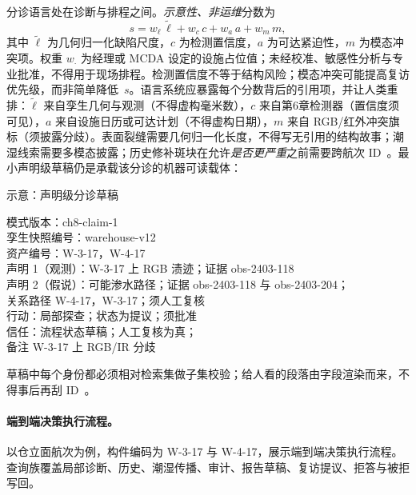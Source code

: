 分诊语言处在诊断与排程之间。\emph{示意性、非运维}分数为
\begin{equation}
\label{eq:ch8-score}
s = w_{\ell}\,\tilde{\ell} + w_{c}\,c + w_{a}\,a + w_{m}\,m,
\end{equation}
其中 $\tilde{\ell}$ 为几何归一化缺陷尺度，$c$ 为检测置信度，$a$ 为可达紧迫性，$m$ 为模态冲突项。权重 $w_{\cdot}$ 为经理或 MCDA 设定的设施占位值；未经校准、敏感性分析与专业批准，不得用于现场排程。检测置信度不等于结构风险；模态冲突可能提高复访优先级，而非简单降低~$s$。语言系统应暴露每个分数背后的引用项，并让人类重排：$\tilde{\ell}$ 来自孪生几何与观测（不得虚构毫米数），$c$ 来自第6章检测器（置信度须可见），$a$ 来自设施日历或可达计划（不得虚构日期），$m$ 来自 RGB/红外冲突旗标（须披露分歧）。表面裂缝需要几何归一化长度，不得写无引用的结构故事；潮湿线索需要多模态披露；历史修补斑块在允许\emph{是否更严重}之前需要跨航次 ID~\cite{zhao2024facade,zhao2026physical,jeon2025hybridrag}。最小声明级草稿仍是承载该分诊的机器可读载体：

\begin{programcode}{示意：声明级分诊草稿}
\begin{plainlisting}
模式版本：ch8-claim-1\\
孪生快照编号：warehouse-v12\\
资产编号：W-3-17，W-4-17\\
声明 1（观测）：W-3-17 上 RGB 渍迹；证据 obs-2403-118\\
声明 2（假说）：可能渗水路径；证据 obs-2403-118 与 obs-2403-204；\\
关系路径 W-4-17，W-3-17；须人工复核\\
行动：局部探查；状态为提议；须批准\\
信任：流程状态草稿；人工复核为真；\\
备注 W-3-17 上 RGB/IR 分歧
\end{plainlisting}
\end{programcode}

草稿中每个身份都必须相对检索集做子集校验；给人看的段落由字段渲染而来，不得事后再刮 ID~\cite{zheng2023bimassistant,joffe2025buildingcodes}。

\paragraph{端到端决策执行流程。}
\label{par:ch8-e2e}
以仓立面航次为例，构件编码为 W-3-17 与 W-4-17，展示端到端决策执行流程。查询族覆盖局部诊断、历史、潮湿传播、审计、报告草稿、复访提议、拒答与被拒写回。

